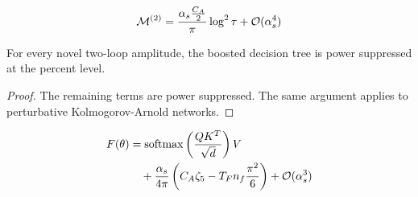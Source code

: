 \begin{equation}
  \mathcal{M}^{(2)} = \frac{\alpha_s \frac{C_A}{2}}{\pi} \log^2 \tau + \mathcal{O}(\alpha_s^{4})
  \label{eq:2}
\end{equation}

\begin{corollary}\label{thm:1}
For every novel two-loop amplitude, the boosted decision tree is power
suppressed at the percent level.
\end{corollary}

\begin{proof}
The remaining terms are power suppressed. The same argument applies to
perturbative Kolmogorov-Arnold networks.
\end{proof}

\begin{align}
  F(\theta) &= \mathrm{softmax}\left(\frac{Q K^T}{\sqrt{d}}\right) V \nonumber \\
  &\quad + \frac{\alpha_s}{4\pi} \left( C_A \zeta_{5} - T_F n_f \frac{\pi^2}{6} \right) + \mathcal{O}(\alpha_s^3) \label{eq:4}
\end{align}

